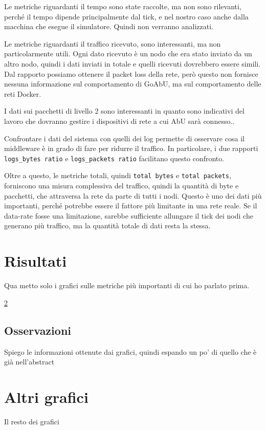 \documentclass[12pt, a4paper]{article}
\begin{document}
Le metriche riguardanti il tempo sono state raccolte, ma non sono rilevanti, perché il tempo dipende principalmente dal tick, e nel nostro caso anche dalla macchina che esegue il simulatore. Quindi non verranno analizzati.

Le metriche riguardanti il traffico ricevuto, sono interessanti, ma non particolarmente utili. Ogni dato ricevuto è un nodo che era stato inviato da un altro nodo, quindi i dati inviati in totale e quelli ricevuti dovrebbero essere simili.
Dal rapporto possiamo ottenere il packet loss della rete, però questo non fornisce nessuna informazione sul comportamento di GoAbU, ma sul comportamento delle reti Docker.

I dati sui pacchetti di livello 2 sono interessanti in quanto sono indicativi del lavoro che dovranno gestire i dispositivi di rete a cui AbU sarà connesso..

Confrontare i dati del sistema con quelli dei log permette di osservare cosa il middleware è in grado di fare per ridurre il traffico. In particolare, i due rapporti \lstinline{logs_bytes ratio} e \lstinline{logs_packets ratio} facilitano questo confronto.

Oltre a questo, le metriche totali, quindi \lstinline{total bytes} e \lstinline{total packets}, forniscono una misura complessiva del traffico, quindi la quantità di byte e pacchetti, che attraversa la rete da parte di tutti i nodi.
Questo è uno dei dati più importanti, perché potrebbe essere il fattore più limitante in una rete reale. Se il data-rate fosse una limitazione, sarebbe sufficiente allungare il tick dei nodi che generano più traffico, ma la quantità totale di dati resta la stessa.

\section{Risultati}

Qua metto solo i grafici sulle metriche più importanti di cui ho parlato prima.

\ref{appendix:grafici}

\subsection{Osservazioni}

Spiego le informazioni ottenute dai grafici, quindi espando un po' di quello che è già nell'abstract \\




\appendix

\section{Altri grafici}\label{appendix:grafici}

Il resto dei grafici
\end{document}
